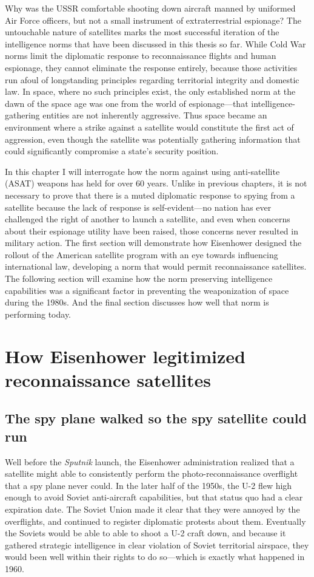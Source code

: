 \documentclass{report}
\begin{document}
Why was the USSR comfortable shooting down aircraft manned by uniformed Air Force officers, but not a small instrument of extraterrestrial espionage? The untouchable nature of satellites marks the most successful iteration of the intelligence norms that have been discussed in this thesis so far. While Cold War norms limit the diplomatic response to reconnaissance flights and human espionage, they cannot eliminate the response entirely, because those activities run afoul of longstanding principles regarding territorial integrity and domestic law. In space, where no such principles exist, the only established norm at the dawn of the space age was one from the world of espionage---that intelligence-gathering entities are not inherently aggressive. Thus space became an environment where a strike against a satellite would constitute the first act of aggression, even though the satellite was potentially gathering information that could significantly compromise a state's security position.

In this chapter I will interrogate how the norm against using anti-satellite (ASAT) weapons has held for over 60 years. Unlike in previous chapters, it is not necessary to prove that there is a muted diplomatic response to spying from a satellite because the lack of response is self-evident---no nation has ever challenged the right of another to launch a satellite, and even when concerns about their espionage utility have been raised, those concerns never resulted in military action. The first section will demonstrate how Eisenhower designed the rollout of the American satellite program with an eye towards influencing international law, developing a norm that would permit reconnaissance satellites. The following section will examine how the norm preserving intelligence capabilities was a significant factor in preventing the weaponization of space during the 1980s. And the final section discusses how well that norm is performing today.

\section{How Eisenhower legitimized reconnaissance satellites}
\subsection{The spy plane walked so the spy satellite could run}
Well before the \emph{Sputnik} launch, the Eisenhower administration realized that a satellite might able to consistently perform the photo-reconnaissance overflight that a spy plane never could. In the later half of the 1950s, the U-2 flew high enough to avoid Soviet anti-aircraft capabilities, but that status quo had a clear expiration date. The Soviet Union made it clear that they were annoyed by the overflights, and continued to register diplomatic protests about them. Eventually the Soviets would be able to able to shoot a U-2 craft down, and because it gathered strategic intelligence in clear violation of Soviet territorial airspace, they would been well within their rights to do so---which is exactly what happened in 1960.
\end{document}
